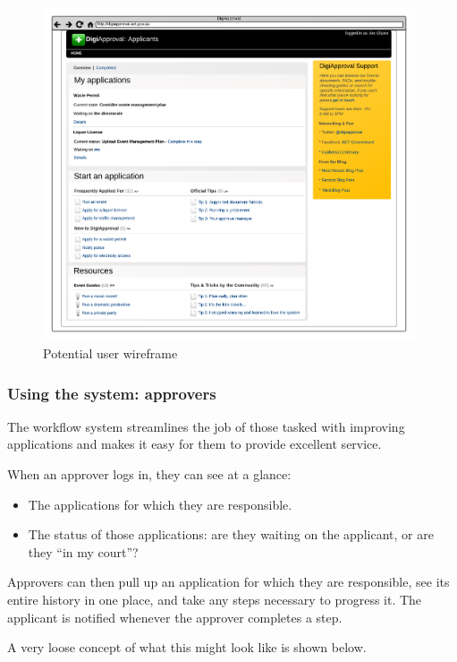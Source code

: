 \documentclass[12pt]{article}
\begin{document}
\begin{figure}[htbp]
\centering
\includegraphics[width=0.98\textwidth]{./imgs/user-wireframe.png}
\caption{Potential user wireframe}
\end{figure}
\newpage
\subsubsection{Using the system: approvers}

The workflow system streamlines the job of those tasked with improving
applications and makes it easy for them to provide excellent service.

When an approver logs in, they can see at a glance: 
\begin{itemize}
\item The applications for which they are responsible.
\item The status of those applications: are they waiting on the
  applicant, or are they ``in my court''?
\end{itemize}

Approvers can then pull up an application for which they are
responsible, see its entire history in one place, and take any steps
necessary to progress it. The applicant is notified whenever the
approver completes a step.

A very loose concept of what this might look like is shown below.
\end{document}
